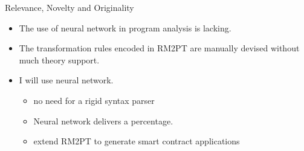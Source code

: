 \documentclass[xcolor=svgnames]{beamer}
\begin{document}
\begin{frame}{Relevance, Novelty and Originality}
\begin{itemize}
\item The use of neural network in program analysis is lacking.
\item The transformation rules encoded in RM2PT are manually devised without much theory support.
\item I will use neural network.
\begin{itemize}
\item no need for a rigid syntax parser
\item Neural network delivers a percentage.
\item extend RM2PT to generate smart contract applications
\end{itemize}
\end{itemize}


\end{frame}
\end{document}

